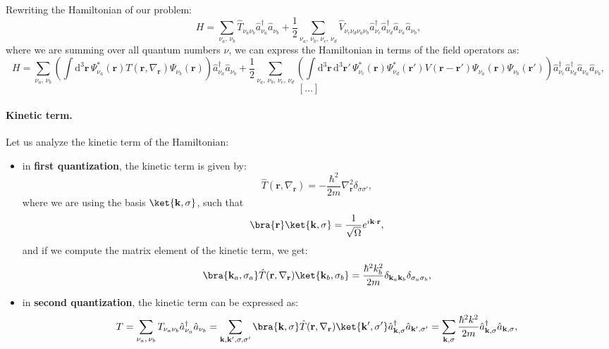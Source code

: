 Rewriting the Hamiltonian of our problem:
\[
    H = \sum_{\nu_a,\,\nu_b} \hat{T}_{\nu_a \nu_b} \hat{a}_{\nu_a}^\dagger \hat{a}_{\nu_b} + \frac{1}{2} \sum_{\nu_a,\,\nu_b,\,\nu_c,\,\nu_d} \hat{V}_{\nu_c \nu_d \nu_a \nu_b} \hat{a}_{\nu_c}^\dagger \hat{a}_{\nu_d}^\dagger \hat{a}_{\nu_a} \hat{a}_{\nu_b},
\]
where we are summing over all quantum numbers $\nu$, we can express the Hamiltonian in terms of the field operators as:
\[
    H = \sum_{\nu_a,\,\nu_b} \left( \int \mathrm{d}^3 \mathbf{r} \, \Psi_{\nu_a}^*(\mathbf{r}) T (\mathbf{r}, \nabla_{\mathbf{r}}) \Psi_{\nu_b}(\mathbf{r}) \right) \hat{a}_{\nu_a}^\dagger \hat{a}_{\nu_b} + \frac{1}{2} \sum_{\nu_a,\,\nu_b,\,\nu_c,\,\nu_d} \left( \int \mathrm{d}^3 \mathbf{r} \, \mathrm{d}^3 \mathbf{r}' \, \Psi_{\nu_c}^*(\mathbf{r}) \Psi_{\nu_d}^*(\mathbf{r}') V(\mathbf{r} - \mathbf{r}') \Psi_{\nu_a}(\mathbf{r}) \Psi_{\nu_b}(\mathbf{r}') \right) \hat{a}_{\nu_c}^\dagger \hat{a}_{\nu_d}^\dagger \hat{a}_{\nu_a} \hat{a}_{\nu_b},
\]
\[
    [\dots]
\]

\paragraph{Kinetic term.}
Let us analyze the kinetic term of the Hamiltonian:
\begin{itemize}
    \item in \textbf{first quantization}, the kinetic term is given by:
          \[
              \hat{T}(\mathbf{r}, \nabla_{\mathbf{r}}) = -\frac{\hbar^2}{2m} \nabla^2_{\mathbf{r}} \delta_{\sigma \sigma'},
          \]
          where we are using the basis \(\ket{\mathbf{k}, \sigma}\), such that
          \[
              \bra{\mathbf{r}}\ket{\mathbf{k}, \sigma} = \frac{1}{\sqrt{\Omega}} e^{i \mathbf{k} \cdot \mathbf{r}},
          \]
          and if we compute the matrix element of the kinetic term, we get:
          \[
              \bra{\mathbf{k}_a, \sigma_a} \hat{T}(\mathbf{r}, \nabla_{\mathbf{r}}) \ket{\mathbf{k}_b, \sigma_b} = \frac{\hbar^2 k_b^2}{2m} \delta_{\mathbf{k}_a \mathbf{k}_b} \delta_{\sigma_a \sigma_b},
          \]
    \item in \textbf{second quantization}, the kinetic term can be expressed as:
          \[
              T = \sum_{\nu_a,\,\nu_b} T_{\nu_a \nu_b} \hat{a}_{\nu_a}^\dagger \hat{a}_{\nu_b} = \sum_{\mathbf{k}, \mathbf{k}^{\prime}, \sigma, \sigma^{\prime}} \bra{\mathbf{k}, \sigma} \hat{T}(\mathbf{r}, \nabla_{\mathbf{r}}) \ket{\mathbf{k}^{\prime}, \sigma^{\prime}} \hat{a}_{\mathbf{k}, \sigma}^\dagger \hat{a}_{\mathbf{k}^{\prime}, \sigma^{\prime}} = \sum_{\mathbf{k}, \sigma} \frac{\hbar^2 k^2}{2m} \hat{a}_{\mathbf{k}, \sigma}^\dagger \hat{a}_{\mathbf{k}, \sigma},
          \]
\end{itemize}

